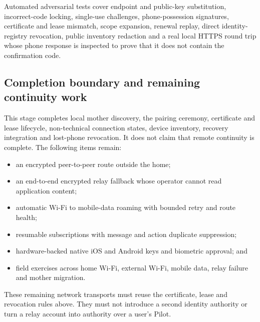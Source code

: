 Automated adversarial tests cover endpoint and public-key substitution, incorrect-code locking,
single-use challenges, phone-possession signatures, certificate and lease mismatch, scope
expansion, renewal replay, direct identity-registry revocation, public inventory redaction and a
real local HTTPS round trip whose phone response is inspected to prove that it does not contain the
confirmation code.

\subsection{Completion boundary and remaining continuity work}

This stage completes local mother discovery, the pairing ceremony, certificate and lease lifecycle,
non-technical connection states, device inventory, recovery integration and lost-phone revocation.
It does not claim that remote continuity is complete.  The following items remain:
\begin{itemize}
  \item an encrypted peer-to-peer route outside the home;
  \item an end-to-end encrypted relay fallback whose operator cannot read application content;
  \item automatic Wi-Fi to mobile-data roaming with bounded retry and route health;
  \item resumable subscriptions with message and action duplicate suppression;
  \item hardware-backed native iOS and Android keys and biometric approval; and
  \item field exercises across home Wi-Fi, external Wi-Fi, mobile data, relay failure and mother
  migration.
\end{itemize}

These remaining network transports must reuse the certificate, lease and revocation rules above.
They must not introduce a second identity authority or turn a relay account into authority over a
user's Pilot.
